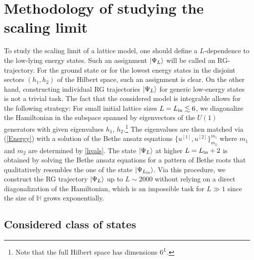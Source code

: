 \documentclass[12pt]{article}
\numberwithin{equation}{section}
\begin{document}
	\section{Methodology of studying the scaling limit}\label{sec:methodology}
	
	To study the scaling limit of a lattice model, one should define a $L$-dependence to the low-lying energy states. Such an assignment $\ket{\Psi_L}$ will be called an RG-trajectory. For the ground state or for the lowest energy states in the disjoint sectors $(h_1,h_2)$ of the Hilbert space, such an assignment is clear. On the other hand, constructing individual RG trajectories $\ket{\Psi_L}$ for generic low-energy states is not a trivial task. The fact that the considered model is integrable allows for the following strategy: For small initial lattice sizes $L=L_{\rm{in}} \lesssim 6$, we diagonalize the Hamiltonian in the subspace spanned by eigenvectors of the $U(1)$ generators with given eigenvalues  $h_1$, $h_2$.\footnote{Note that the full Hilbert space has dimensions $6^{L}$.} The eigenvalues are then matched via (\ref{Energy}) with a solution of the Bethe ansatz equations $\{u^{[1]},u^{[2]}\}^{m_1}_{m_2}$ where $m_1$ and $m_2$ are determined by \eqref{hvals}. The state $\ket{\Psi_{L}}$ at higher $L=L_{\rm{in}}+2$ is obtained by solving the Bethe ansatz equations for a pattern of Bethe roots that qualitatively resembles the one of the state $\ket{\Psi_{L_{\rm{in}}}}$. Via this procedure, we construct the RG trajectory $\ket{\Psi_{L}}$ up to $L \sim 2000$ without relying on a direct diagonalization of the Hamiltonian, which is an impossible task for $L\gg 1$ since the size of $\mathbb{H}$ grows exponentially. 
	
	\subsection{Considered class of states}
	
\end{document}
